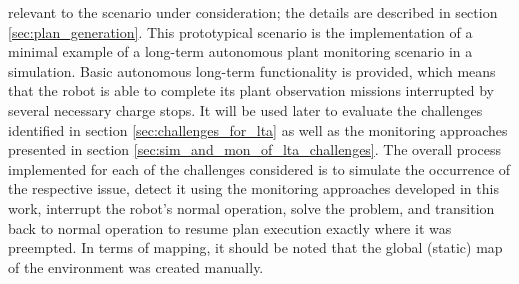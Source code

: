 \documentclass[english, master, utf8]{base/thesis_KBS}
\begin{document}
relevant to the scenario under consideration; the details are described in section \ref{sec:plan_generation}. This prototypical scenario is the implementation of a minimal 
example of a long-term autonomous plant monitoring scenario in a simulation. Basic autonomous long-term functionality is provided, which means that the robot is able to 
complete its plant observation missions interrupted by several necessary charge stops. It will be used later to evaluate the challenges identified in section 
\ref{sec:challenges_for_lta} as well as the monitoring approaches presented in section \ref{sec:sim_and_mon_of_lta_challenges}.
The overall process implemented for each of the challenges considered is to simulate the occurrence of the respective issue, detect it using
the monitoring approaches developed in this work, interrupt the robot's normal operation, solve the problem, and transition back to normal operation to resume 
plan execution exactly where it was preempted. In terms of mapping, it should be noted that the global (static) map of the environment was created manually.
\end{document}
